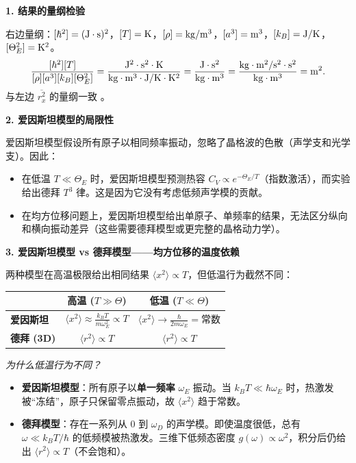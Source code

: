 \begin{insightbox}[物理图像与概念串联]
\textbf{1. 结果的量纲检验}

右边量纲：$[\hbar^2]=({\rm J\cdot s})^2$，$[T]={\rm K}$，$[\rho]={\rm kg/m^3}$，$[a^3]={\rm m^3}$，$[k_B]={\rm J/K}$，$[\Theta_E^2]={\rm K^2}$。
\begin{equation}
\frac{[\hbar^2][T]}{[\rho][a^3][k_B][\Theta_E^2]} = \frac{{\rm J^2\cdot s^2\cdot K}}{{\rm kg\cdot m^3 \cdot J/K \cdot K^2}} = \frac{{\rm J\cdot s^2}}{{\rm kg\cdot m^3}} = \frac{{\rm kg\cdot m^2/s^2 \cdot s^2}}{{\rm kg\cdot m^3}} = {\rm m^2}.
\end{equation}
与左边 $\overline{r_x^2}$ 的量纲一致 \checkmark。

\textbf{2. 爱因斯坦模型的局限性}

爱因斯坦模型假设所有原子以相同频率振动，忽略了晶格波的色散（声学支和光学支）。因此：
\begin{itemize}
    \item 在低温 $T\ll\Theta_E$ 时，爱因斯坦模型预测热容 $C_V\propto e^{-\Theta_E/T}$（指数激活），而实验给出德拜 $T^3$ 律。这是因为它没有考虑低频声学模的贡献。
    \item 在均方位移问题上，爱因斯坦模型给出单原子、单频率的结果，无法区分纵向和横向振动差异（这些需要德拜模型或更完整的晶格动力学）。
\end{itemize}

\textbf{3. 爱因斯坦模型 vs 德拜模型——均方位移的温度依赖}

两种模型在高温极限给出相同结果 $\langle x^2\rangle\propto T$，但低温行为截然不同：

\begin{center}
\begin{tabular}{lcc}
\toprule
 & \textbf{高温} ($T\gg\Theta$) & \textbf{低温} ($T\ll\Theta$) \\
\midrule
\textbf{爱因斯坦} & $\displaystyle\langle x^2\rangle\approx\frac{k_BT}{m\omega_E^2}\propto T$ & $\displaystyle\langle x^2\rangle\to\frac{\hbar}{2m\omega_E}=\text{常数}$ \\[10pt]
\textbf{德拜 (3D)} & $\displaystyle\langle r^2\rangle\propto T$ & $\displaystyle\langle r^2\rangle\propto T$ \\
\bottomrule
\end{tabular}
\end{center}

\textit{为什么低温行为不同？}

\begin{itemize}
    \item \textbf{爱因斯坦模型}：所有原子以\textbf{单一频率} $\omega_E$ 振动。当 $k_BT\ll\hbar\omega_E$ 时，热激发被``冻结''，原子只保留零点振动，故 $\langle x^2\rangle$ 趋于常数。
    \item \textbf{德拜模型}：存在一系列从 $0$ 到 $\omega_D$ 的声学模。即使温度很低，总有 $\omega\ll k_BT/\hbar$ 的低频模被热激发。三维下低频态密度 $g(\omega)\propto\omega^2$，积分后仍给出 $\langle r^2\rangle\propto T$（不会饱和）。
\end{itemize}


\end{insightbox}
